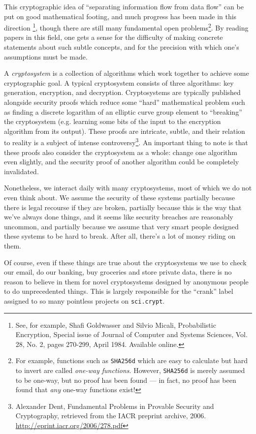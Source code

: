 \documentclass[letterpaper]{article}
\begin{document}
This cryptographic idea of ``separating information flow from data flow''
can be put on good mathematical footing, and much progress has been made
in this direction \footnote{See, for example, Shafi Goldwasser and Silvio
Micali, Probabilistic Encryption, Special issue of Journal of Computer and
Systems Sciences, Vol. 28, No. 2, pages 270-299, April 1984. Available online.},
though there are still many fundamental open problems\footnote{For example,
functions such as \texttt{SHA256d} which are easy to calculate but hard to
invert are called \emph{one-way functions}. However, \texttt{SHA256d} is
merely assumed to be one-way, but no proof has been found --- in fact, no
proof has been found that \emph{any} one-way functions exist!}. By reading
papers in this field, one gets a sense for the difficulty of making
concrete statements about such subtle concepts, and for the precision
with which one's assumptions must be made.

A \emph{cryptosystem} is a collection of algorithms which work together
to achieve some cryptographic goal. A typical cryptosystem consists of
three algorithms: key generation, encryption, and decryption. Cryptosystems
are typically published alongside security proofs which reduce some ``hard''
mathematical
problem such as finding a discrete logarithm of an elliptic curve group
element to ``breaking'' the cryptosystem (e.g. learning some bits of the input to
the encryption algorithm from its output).
These proofs are intricate, subtle, and their relation to reality
is a subject of intense controversy\footnote{Alexander Dent, Fundamental
Problems in Provable Security and Cryptography, retrieved from the IACR
preprint archive, 2006. \url{http://eprint.iacr.org/2006/278.pdf}}. An
important thing to note is that these proofs also consider the cryptosystem
as a whole: change one algorithm even slightly, and the security proof of
another algorithm could be completely invalidated.

Nonetheless, we interact daily with many cryptosystems, most of which we
do not even think about. We assume the security of these systems partially
because there is legal recourse if they are broken, partially because this
is the way that we've always done things, and it seems like security breaches
are reasonably uncommon, and partially because we assume that very smart people
designed these systems to be hard to break. After all, there's a lot of money
riding on them.

Of course, even if these things are true about the cryptosystems we use to
check our email, do our banking, buy groceries and store private data, there
is no reason to believe in them for novel cryptosystems designed by anonymous
people to do unprecedented things. This is largely responsible for the ``crank''
label assigned to so many pointless projects on \texttt{sci.crypt}.
\end{document}
